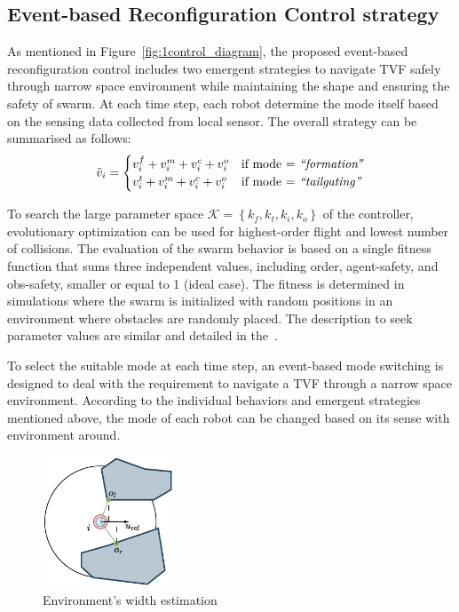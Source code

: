 \subsection{Event-based Reconfiguration Control strategy}\label{sec:erc}

As mentioned in Figure~\ref{fig:1control_diagram}, the proposed event-based reconfiguration control includes two emergent strategies to navigate TVF safely through narrow space environment while maintaining the shape and ensuring the safety of swarm. At each time step, each robot determine the mode itself based on the sensing data collected from local sensor. The overall strategy can be summarised as follows:
\begin{equation}
    \tilde{v}_i=\begin{cases}
        v_i^f+v_i^m+v_i^c+v_i^o & \text{if mode = \textit{``formation''}}\\
        v_i^t+v_i^m+v_i^c+v_i^o & \text{if mode = \textit{``tailgating''}}
    \end{cases}
    \label{eqn:1v}
\end{equation}

To search the large parameter space $\mathcal{K}=\left\{k_f,k_t,k_i,k_o\right\}$ of the controller, evolutionary optimization can be used for highest-order flight and lowest number of collisions. The evaluation of the swarm behavior is based on a single fitness function that sums three independent values, including order, agent-safety, and obs-safety, smaller or equal to 1 (ideal case). The fitness is determined in simulations where the swarm is initialized with random positions in an environment where obstacles are  randomly placed. The description  to seek parameter values are similar and detailed in the~\cite{Vsrhelyi2018}.

To select the suitable mode at each time step, an event-based mode switching is designed to deal with the requirement to navigate a TVF through a narrow space environment. According to the individual behaviors and emergent strategies mentioned above, the mode of each robot can be changed based on its sense with environment around.

\begin{figure}
    \centering
    \includegraphics[width=0.35\textwidth]{paper2/images/we.pdf}
    \caption{Environment's width estimation}
    \label{fig:1we}
\end{figure}

